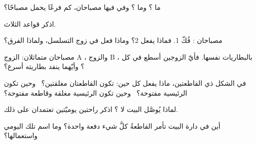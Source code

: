 \begin{exercise}[$\star$]\label{exo:g5:series-parallel-circuits:1}
ما ؟ وما ؟ وفي  فيها مصباحان، كم
فرعًا يحمل مصباحًا؟
\end{exercise}

\begin{exercise}[$\star$]\label{exo:g5:series-parallel-circuits:2}
اذكر قواعد  الثلاث.
\end{exercise}

\begin{exercise}[$\star$]\label{exo:g5:series-parallel-circuits:3}
مصباحان : فُكّ  1. فماذا يفعل  2؟ وماذا
فعل في زوج التسلسل، ولماذا الفرق؟
\end{exercise}

\begin{exercise}[$\star$]\label{exo:g5:series-parallel-circuits:4}
مصباحان متماثلان: الزوج A ، والزوج B ،
بالبطاريات نفسها. فأيّ الزوجين أسطع في كل ؟ وأيّهما ينفد
بطاريته أسرع؟
\end{exercise}

\begin{exercise}[$\star$]\label{exo:g5:series-parallel-circuits:5}
في الشكل ذي القاطعتين، ماذا يفعل كل  حين: تكون القاطعتان
مغلقتين؟ \ وحين تكون الرئيسية مفتوحة؟ \ وحين تكون الرئيسية
مغلقة وقاطعة  مفتوحة؟
\end{exercise}

\begin{exercise}[$\star$]\label{exo:g5:series-parallel-circuits:6}
لماذا يُوصَّل البيت  لا ؟ اذكر راحتين
يوميّتين تعتمدان على ذلك.
\end{exercise}

\begin{exercise}[$\star$]\label{exo:g5:series-parallel-circuits:7}
أين في دارة البيت تأمر القاطعةُ كلَّ شيء دفعة واحدة؟ وما اسم
تلك  اليومي واستعمالها؟
\end{exercise}

